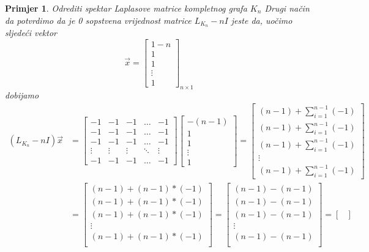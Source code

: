 \documentclass[11pt]{article}
\newtheorem{example}{Primjer}
\begin{document}
\begin{example}{Odrediti spektar Laplasove matrice kompletnog grafa $K_n$}
	Drugi način da potvrdimo da je 0 sopstvena vrijednost matrice $L_{K_n} - n I$ jeste da, uočimo sljedeći vektor
	\[
	\vec{x} =
	\begin{bmatrix}
	 1-n \\ 
	1 \\
	1 \\
	\vdots \\
	1
	\end{bmatrix}_{n \times 1}
	\]
	dobijamo
	\[
	\begin{split}
	(L_{K_n} - nI) \vec{x} &= 
	\begin{bmatrix}
	-1 & -1 & -1 & \dots & -1 \\
	-1 & -1 & -1 & \dots & -1 \\
	-1 & -1 & -1 & \dots & -1 \\
	\vdots & \vdots & \vdots & \ddots & \vdots \\
	-1 & -1 & -1 & \dots & -1
	\end{bmatrix}
	\begin{bmatrix}
	-(n-1) \\
	1 \\
	1 \\
	\vdots \\
	1
	\end{bmatrix}
	 = 
	\begin{bmatrix}
	(n-1) + \sum_{i=1}^{n-1} (-1) \\
	(n-1) + \sum_{i=1}^{n-1} (-1) \\
	(n-1) + \sum_{i=1}^{n-1} (-1) \\
	\vdots \\
	(n-1) + \sum_{i=1}^{n-1} (-1)
	\end{bmatrix}  \\
	& =
	\begin{bmatrix}
	(n-1) + (n-1) * (-1) \\
	(n-1) + (n-1) * (-1) \\
	(n-1) + (n-1) * (-1) \\
	\vdots \\
	(n-1) + (n-1) * (-1) \\
	\end{bmatrix}
	=
	\begin{bmatrix}
	(n-1) - (n-1) \\
	(n-1) - (n-1) \\
	(n-1) - (n-1) \\
	\vdots \\
	(n-1) - (n-1) \\
	\end{bmatrix}
	 =
	\begin{bmatrix}

\end{bmatrix}
\end{split}\]
\end{example}
\end{document}

